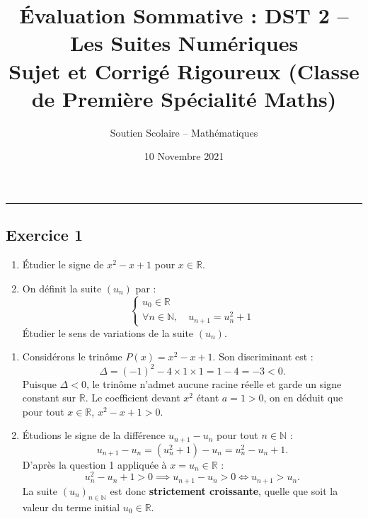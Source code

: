 \documentclass[11pt,a4paper]{article}
\title{\textbf{Évaluation Sommative : DST 2 -- Les Suites Numériques}\\\large Sujet et Corrigé Rigoureux (Classe de Première Spécialité Maths)}
\author{Soutien Scolaire -- Mathématiques}
\date{10 Novembre 2021}
\newcommand{\N}{\mathbb{N}}
\newcommand{\R}{\mathbb{R}}
\begin{document}
\maketitle

\hrule
\vspace{0.5cm}

\subsection*{Exercice 1}
\begin{enumerate}
    \item Étudier le signe de $x^2 - x + 1$ pour $x \in \R$.
    \item On définit la suite $(u_n)$ par :
    \[
    \begin{cases}
    u_0 \in \R\\
    \forall n \in \N, \quad u_{n+1} = u_n^2 + 1
    \end{cases}
    \]
    Étudier le sens de variations de la suite $(u_n)$.
\end{enumerate}

\begin{correctionbox}
\begin{enumerate}
    \item Considérons le trinôme $P(x) = x^2 - x + 1$. Son discriminant est :
    \[
    \Delta = (-1)^2 - 4 \times 1 \times 1 = 1 - 4 = -3 < 0.
    \]
    Puisque $\Delta < 0$, le trinôme n'admet aucune racine réelle et garde un signe constant sur $\R$.
    Le coefficient devant $x^2$ étant $a = 1 > 0$, on en déduit que pour tout $x \in \R$, $x^2 - x + 1 > 0$.
    \item Étudions le signe de la différence $u_{n+1} - u_n$ pour tout $n \in \N$ :
    \[
    u_{n+1} - u_n = (u_n^2 + 1) - u_n = u_n^2 - u_n + 1.
    \]
    D'après la question 1 appliquée à $x = u_n \in \R$ :
    \[
    u_n^2 - u_n + 1 > 0 \implies u_{n+1} - u_n > 0 \iff u_{n+1} > u_n.
    \]
    La suite $(u_n)_{n \in \N}$ est donc \textbf{strictement croissante}, quelle que soit la valeur du terme initial $u_0 \in \R$.
\end{enumerate}
\end{correctionbox}

\end{document}
